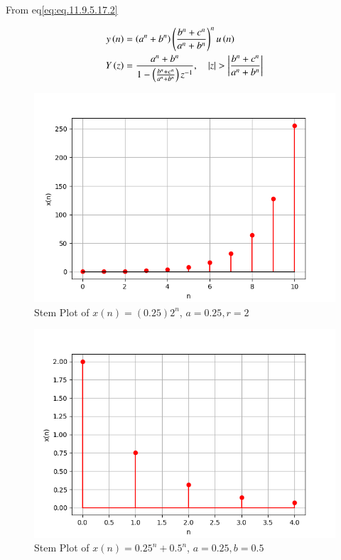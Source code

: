 \documentclass[journal,12pt,twocolumn]{IEEEtran}
\theoremstyle{remark}
\begin{document}
From eq\eqref{eq:eq.11.9.5.17.2}

\begin{align}
    y\left(n\right) &= \left(a^n + b^n\right) \left(\frac{b^n + c^n}{a^n + b^n}\right)^{n} u\left(n\right)\\
    Y\left(z\right) &= \frac{a^n + b^n}{1-\left(\frac{b^n + c^n}{a^n + b^n}\right) z^{-1}}, \quad \left\vert z\right\vert>\left\vert\frac{b^n + c^n}{a^n + b^n}\right\vert
\end{align}


\begin{figure}[ht]
   \centering
   \includegraphics[width=0.8\columnwidth]{figs/gp1.png}
   \caption{Stem Plot of $x(n) = (0.25) 2^n$, $a= 0.25, r=2$}
\end{figure}

\begin{figure}[ht]
   \centering
   \includegraphics[width=0.8\columnwidth]{figs/gp2.png}
   \caption{Stem Plot of $x(n) = 0.25^n + 0.5^n$, $a=0.25, b=0.5$}
\end{figure}
\end{document}
